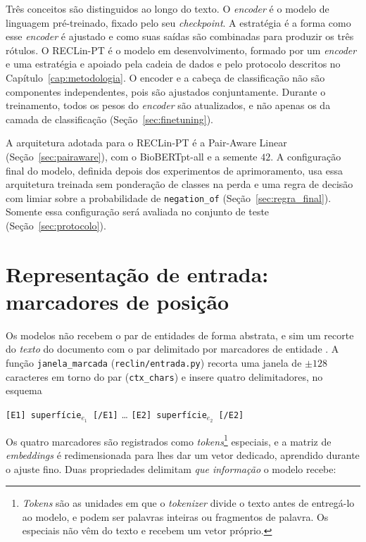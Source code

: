 Três conceitos são distinguidos ao longo do texto. O \emph{encoder} é o modelo de
linguagem pré-treinado, fixado pelo seu \emph{checkpoint}. A estratégia é a forma
como esse \emph{encoder} é ajustado e como suas saídas são combinadas para produzir
os três rótulos. O RECLin-PT é o modelo em desenvolvimento, formado por um
\emph{encoder} e uma estratégia e apoiado pela cadeia de dados e pelo protocolo
descritos no Capítulo~\ref{cap:metodologia}. O encoder e a cabeça de classificação não são componentes independentes, pois são ajustados conjuntamente. Durante o treinamento, todos os pesos do \emph{encoder} são atualizados, e não apenas os da camada de classificação (Seção~\ref{sec:finetuning}).

A arquitetura adotada para o RECLin-PT é a Pair-Aware Linear
(Seção~\ref{sec:pairaware}), com o BioBERTpt-all e a semente $42$. A configuração
final do modelo, definida depois dos experimentos de aprimoramento, usa essa
arquitetura treinada sem ponderação de classes na perda e uma regra de decisão com
limiar sobre a probabilidade de \texttt{negation\_of}
(Seção~\ref{sec:regra_final}). Somente essa configuração será avaliada no conjunto
de teste (Seção~\ref{sec:protocolo}).

\section{Representação de entrada: marcadores de posição}
\label{sec:markers}

Os modelos não recebem o par de entidades de forma abstrata, e sim um recorte do
\emph{texto} do documento com o par delimitado por marcadores de entidade
\cite{soares_2019_markers}. A função \texttt{janela\_marcada}
(\texttt{reclin/entrada.py}) recorta uma janela de $\pm 128$ caracteres em torno do
par (\texttt{ctx\_chars}) e insere quatro delimitadores, no esquema
%
\begin{center}
\texttt{[E1] superfície$_{e_1}$ [/E1]} \quad\dots\quad
\texttt{[E2] superfície$_{e_2}$ [/E2]}
\end{center}
%
Os quatro marcadores são registrados como \emph{tokens}\footnote{\emph{Tokens} são
as unidades em que o \emph{tokenizer} divide o texto antes de entregá-lo ao
modelo, e podem ser palavras inteiras ou fragmentos de palavra. Os especiais não
vêm do texto e recebem um vetor próprio.} especiais, e a matriz de \emph{embeddings}
é redimensionada para lhes dar um vetor dedicado, aprendido durante o ajuste fino.
Duas propriedades delimitam \emph{que informação} o modelo recebe:

